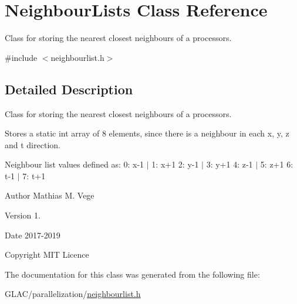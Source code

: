 \hypertarget{class_neighbour_lists}{}\section{Neighbour\+Lists Class Reference}
\label{class_neighbour_lists}


Class for storing the nearest closest neighbours of a processors.  




{\ttfamily \#include $<$neighbourlist.\+h$>$}



\subsection{Detailed Description}
Class for storing the nearest closest neighbours of a processors. 

Stores a static int array of 8 elements, since there is a neighbour in each x, y, z and t direction.

Neighbour list values defined as\+: 0\+: x-\/1 $\vert$ 1\+: x+1 2\+: y-\/1 $\vert$ 3\+: y+1 4\+: z-\/1 $\vert$ 5\+: z+1 6\+: t-\/1 $\vert$ 7\+: t+1

\begin{DoxyAuthor}{Author}
Mathias M. Vege 
\end{DoxyAuthor}
\begin{DoxyVersion}{Version}
1. 
\end{DoxyVersion}
\begin{DoxyDate}{Date}
2017-\/2019 
\end{DoxyDate}
\begin{DoxyCopyright}{Copyright}
M\+IT Licence 
\end{DoxyCopyright}


The documentation for this class was generated from the following file\+:\begin{DoxyCompactItemize}
\item 
G\+L\+A\+C/parallelization/\mbox{\hyperlink{neighbourlist_8h}{neighbourlist.\+h}}\end{DoxyCompactItemize}
